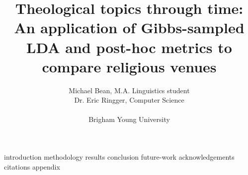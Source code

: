 \documentclass {journal}
\begin{document}
\def \TokenCount {3.1 million}

\title{Theological topics through time:\\
An application of Gibbs-sampled LDA and post-hoc metrics to compare religious venues}

\author{Michael Bean, M.A. Linguistics student\\
Dr. Eric Ringger, Computer Science
\\
\\
Brigham Young University
}
\maketitle

 {introduction}
 {methodology}
 {results}
 {conclusion}
 {future-work}
 {acknowledgements}
 {citations}
 {appendix}
\end{document}
